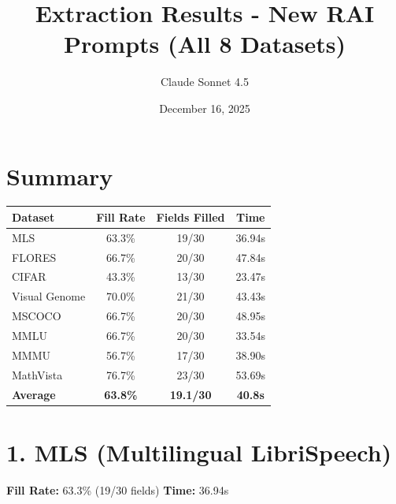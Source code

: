 \documentclass[10pt,a4paper]{article}
\title{\textbf{Extraction Results - New RAI Prompts (All 8 Datasets)}}
\author{Claude Sonnet 4.5}
\date{December 16, 2025}
\begin{document}
\maketitle

\section*{Summary}
\begin{tabular}{|l|c|c|c|}
\hline
\textbf{Dataset} & \textbf{Fill Rate} & \textbf{Fields Filled} & \textbf{Time} \\
\hline
MLS & 63.3\% & 19/30 & 36.94s \\
FLORES & 66.7\% & 20/30 & 47.84s \\
CIFAR & 43.3\% & 13/30 & 23.47s \\
Visual Genome & 70.0\% & 21/30 & 43.43s \\
MSCOCO & 66.7\% & 20/30 & 48.95s \\
MMLU & 66.7\% & 20/30 & 33.54s \\
MMMU & 56.7\% & 17/30 & 38.90s \\
MathVista & 76.7\% & 23/30 & 53.69s \\
\hline
\textbf{Average} & \textbf{63.8\%} & \textbf{19.1/30} & \textbf{40.8s} \\
\hline
\end{tabular}

\newpage

\section*{1. MLS (Multilingual LibriSpeech)}
\textbf{Fill Rate:} 63.3\% (19/30 fields) \quad \textbf{Time:} 36.94s
\end{document}
